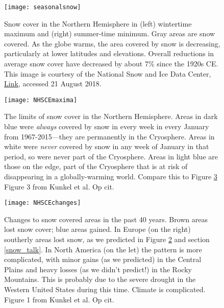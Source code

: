 \documentclass[amstex,12pt]{book}
\begin{document}
\begin{figure}%
	\centering
  \texttt{[image: seasonalsnow]}%
	\caption{Snow cover in the Northern Hemisphere in (left) wintertime maximum and (right) summer-time minimum. Gray areas are snow covered. As the globe warms, the area covered by snow is decreasing, particularly at lower latitudes and elevations. Overall reductions in average snow cover have decreased by about 7\% since the 1920s CE. This image is courtesy of the National Snow and Ice Data Center,  \href{https://nsidc.org/cryosphere/snow/science/where.html}{Link}, accessed 21 August 2018.}
	\label{fig:seasonalsnow}
\end{figure}

\begin{figure}%
	\centering
  \texttt{[image: NHSCEmaxima]}%
	\caption{The limits of snow cover in the Northern Hemisphere. Areas in dark blue were \emph{always} covered by snow in every week in every January from 1967-2015---they are permanently in the Cryosphere. Areas in white were \emph{never} covered by snow in any week of January in that period, so were never part of the Cryosphere. Areas in light blue are those on the edge, part of the Cryosphere that is at risk of  disappearing in a globally-warming world. Compare this to Figure \ref{fig:sce} Figure 3 from Kunkel et al. Op cit.}
	\label{fig:scemax}
\end{figure}

\begin{figure}%
	\centering
  \texttt{[image: NHSCEchanges]}%
	\caption{Changes to snow covered areas in the past 40 years. Brown areas lost snow cover; blue areas gained. In Europe (on the right) southerly areas lost snow, as we predicted in Figure \ref{fig:scemax} and section \ref{snow_talk}. In North America (on the let) the pattern is more complicated, with minor gains (as we predicted) in the Central Plains and heavy losses (as we didn't predict!) in the Rocky Mountains. This is probably due to the severe drought in the Western United States during this time. Climate is complicated. Figure 1 from Kunkel et al. Op cit.}
	\label{fig:sce}
\end{figure}
\end{document}

